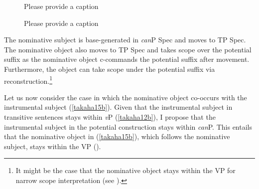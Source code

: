 \documentclass[output=paper]{langscibook}
\begin{document}
\begin{figure}
\begin{floatrow}
\captionsetup{margin=.05\linewidth}
        {\caption{\label{takaha16}\color{red}Please provide a caption}}%
    {\caption{\label{takaha17}\color{red}Please provide a caption}}
\end{floatrow}
\end{figure}


The nominative subject is base-generated in \emph{can}P Spec and moves to TP Spec. The nominative object also moves to TP Spec and takes scope over the potential suffix as the nominative object  c-commands the potential suffix after movement. Furthermore, the object can take scope under the potential suffix via reconstruction.\footnote{It might be the case that the nominative object stays within the VP for narrow scope interpretation (see \citealt{nomura2005, ochisaruwatari2014a}).}

Let us now consider the case in which the nominative object co-occurs with the instrumental subject (\ref{takaha15b}). Given that the instrumental subject in transitive sentences stays within \emph{v}P (\ref{takaha12b}), I propose that the instrumental subject in the potential construction stays within \emph{can}P. This entails that the nominative object in (\ref{takaha15b}), which follows the nominative subject, stays within the VP ().
\end{document}
